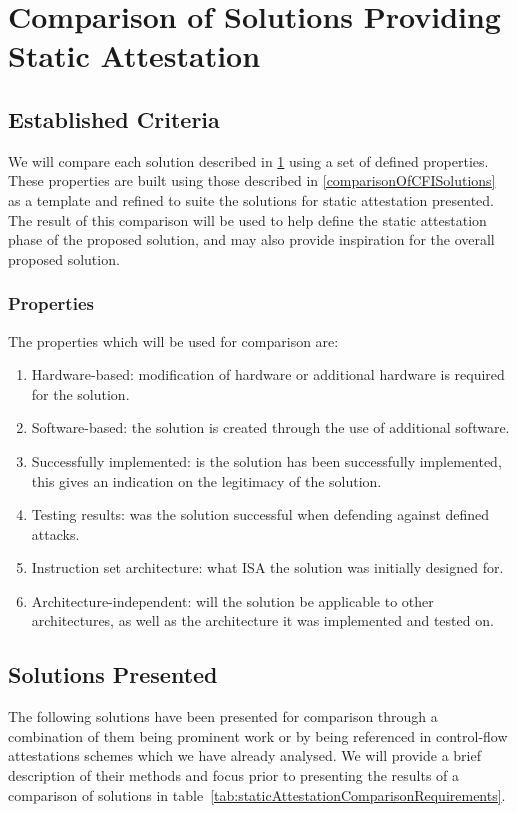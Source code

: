\section{Comparison of Solutions Providing Static Attestation} \label{staticAttestationSolutions}

\subsection{Established Criteria}

We will compare each solution described in \ref{staticAttestationSolutions} using a set of defined properties. These properties are built using those described in \ref{comparisonOfCFISolutions} as a template and refined to suite the solutions for static attestation presented. The result of this comparison will be used to help define the static attestation phase of the proposed solution, and may also provide inspiration for the overall proposed solution.

\subsubsection*{Properties}
The properties which will be used for comparison are:
\begin{enumerate}[label=(\arabic*),noitemsep]
	\item Hardware-based: modification of hardware or additional hardware is required for the solution.			\item Software-based: the solution is created through the use of additional software.
	\item Successfully implemented: is the solution has been successfully implemented, this gives an indication on the legitimacy of the solution.
	\item Testing results: was the solution successful when defending against defined attacks.
	\item Instruction set architecture: what ISA the solution was initially designed for.
	\item Architecture-independent: will the solution be applicable to other architectures, as well as the architecture it was implemented and tested on.
\end{enumerate}

\subsection{Solutions Presented}

The following solutions have been presented for comparison through a combination of them being prominent work or by being referenced in control-flow attestations schemes which we have already analysed. We will provide a brief description of their methods and focus prior to presenting the results of a comparison of solutions in table~\ref{tab:staticAttestationComparisonRequirements}.

